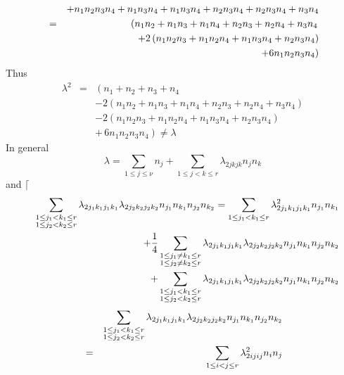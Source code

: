 \documentclass[12pt]{article}
\begin{document}
\begin{itemize}
\begin{eqnarray}
&&+n_{1}n_{2}n_{3}n_{4}+n_{1}n_{3}n_{4}+n_{1}n_{3}n_{4}+n_{2}n_{3}n_{4}+n_{2}n_{3}n_{4}+n_{3}n_{4}
\notag \\
&=&\left(
n_{1}n_{2}+n_{1}n_{3}+n_{1}n_{4}+n_{2}n_{3}+n_{2}n_{4}+n_{3}n_{4}\right. 
\notag \\
&&+2\left(
n_{1}n_{2}n_{3}+n_{1}n_{2}n_{4}+n_{1}n_{3}n_{4}+n_{2}n_{3}n_{4}\right) 
\notag \\
&&\left. +6n_{1}n_{2}n_{3}n_{4}\right)
\end{eqnarray}%
Thus%
\begin{eqnarray*}
\lambda ^{2} &=&\left( n_{1}+n_{2}+n_{3}+n_{4}\right. \\
&&-2\left(
n_{1}n_{2}+n_{1}n_{3}+n_{1}n_{4}+n_{2}n_{3}+n_{2}n_{4}+n_{3}n_{4}\right) \\
&&-2\left(
n_{1}n_{2}n_{3}+n_{1}n_{2}n_{4}+n_{1}n_{3}n_{4}+n_{2}n_{3}n_{4}\right) \\
&&\left. +\,6n_{1}n_{2}n_{3}n_{4}\right) \neq \lambda
\end{eqnarray*}%
In general 
\begin{equation*}
\lambda =\sum_{1\leq j\leq \nu }n_{j}+\sum_{1\leq j<k\leq r}\lambda
_{2jkjk}n_{j}n_{k}
\end{equation*}%
and $\lceil $%
\begin{eqnarray}
&&\sum_{\substack{ 1\leq j_{1}<k_{1}\leq r  \\ 1\leq j_{2}<k_{2}\leq r}}%
\lambda _{2j_{1}k_{1}j_{1}k_{1}}\lambda
_{2j_{2}k_{2}j_{2}k_{2}}n_{j_{1}}n_{k_{1}}n_{j_{2}}n_{k_{2}}=\sum_{1\leq
j_{1}<k_{1}\leq r}\lambda _{2j_{1}k_{1}j_{1}k_{1}}^{2}n_{j_{1}}n_{k_{1}} 
\notag \\
&&+\frac{1}{4}\sum_{\substack{ 1\leq j_{1}\neq k_{1}\leq r  \\ 1\leq
j_{2}\neq k_{2}\leq r}}\lambda _{2j_{1}k_{1}j_{1}k_{1}}\lambda
_{2j_{2}k_{2}j_{2}k_{2}}n_{j_{1}}n_{k_{1}}n_{j_{2}}n_{k_{2}}  \notag \\
&&+\sum_{\substack{ 1\leq j_{1}<k_{1}\leq r  \\ 1\leq j_{2}<k_{2}\leq r}}%
\lambda _{2j_{1}k_{1}j_{1}k_{1}}\lambda
_{2j_{2}k_{2}j_{2}k_{2}}n_{j_{1}}n_{k_{1}}n_{j_{2}}n_{k_{2}}
\end{eqnarray}%
\begin{eqnarray}
&&\sum_{\substack{ 1\leq j_{1}<k_{1}\leq r  \\ 1\leq j_{2}<k_{2}\leq r}}%
\lambda _{2j_{1}k_{1}j_{1}k_{1}}\lambda
_{2j_{2}k_{2}j_{2}k_{2}}n_{j_{1}}n_{k_{1}}n_{j_{2}}n_{k_{2}}  \notag \\
&=&\sum_{1\leq i<j\leq r}\lambda _{2ijij}^{2}n_{i}n_{j}  \notag \\

\end{eqnarray}
\end{itemize}
\end{document}
